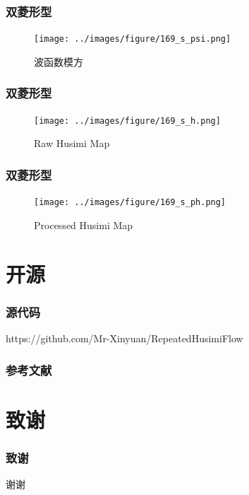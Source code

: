 \documentclass[UTF8]{beamer}
\begin{document}
\begin{frame}
	\frametitle{双菱形型}
	\begin{figure}
		\centering
		\texttt{[image: ../images/figure/169\_s\_psi.png]}
		\caption{波函数模方}
	\end{figure}
\end{frame}

\begin{frame}
	\frametitle{双菱形型}
	\begin{figure}
		\centering
		\texttt{[image: ../images/figure/169\_s\_h.png]}
		\caption{Raw Husimi Map}
	\end{figure}
\end{frame}

\begin{frame}
	\frametitle{双菱形型}
	\begin{figure}
		\centering
		\texttt{[image: ../images/figure/169\_s\_ph.png]}
		\caption{Processed Husimi Map}
	\end{figure}
\end{frame}

\section*{开源}
\begin{frame}
	\frametitle{源代码}
	https://github.com/Mr-Xinyuan/RepeatedHusimiFlow
\end{frame}

\begin{frame}
	\frametitle{参考文献}
	
\end{frame}


\section*{致谢}
\begin{frame}
	\frametitle{致谢}
	\begin{center}
		\Huge 谢谢
	\end{center}
\end{frame}
\end{document}
